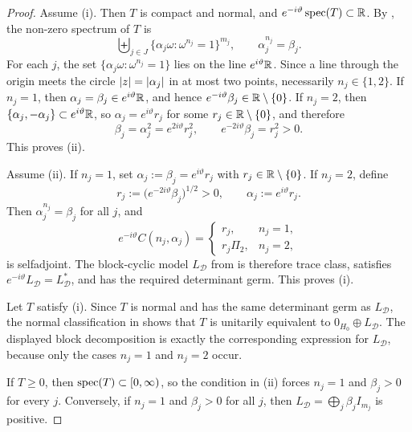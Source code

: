 \begin{proof}
  Assume \textup{(i)}. Then \(T\) is compact and normal, and
  \(e^{-i\vartheta}\operatorname{spec}(T)\subset\mathbb{R}\). By
  , the non-zero spectrum of \(T\)
  is
  \[
    \biguplus_{j\in J}\bigl\{\alpha_j\omega:\omega^{n_j}=1\bigr\}^{m_j},
    \qquad
    \alpha_j^{n_j}=\beta_j.
  \]
  For each \(j\), the set
  \(
    \{\alpha_j\omega:\omega^{n_j}=1\}
  \)
  lies on the line \(e^{i\vartheta}\mathbb{R}\). Since a line through the origin
  meets the circle \(\lvert z \rvert=\lvert \alpha_j \rvert\) in at most two points,
  necessarily \(n_j\in\{1,2\}\). If \(n_j=1\), then
  \(
    \alpha_j=\beta_j\in e^{i\vartheta}\mathbb{R}
  \),
  and hence \(e^{-i\vartheta}\beta_j\in\mathbb{R}\setminus\{0\}\). If
  \(n_j=2\), then
  \(
    \{\alpha_j,-\alpha_j\}\subset e^{i\vartheta}\mathbb{R}
  \),
  so \(\alpha_j=e^{i\vartheta}r_j\) for some
  \(r_j\in \mathbb{R}\setminus\{0\}\), and therefore
  \[
    \beta_j=\alpha_j^2=e^{2i\vartheta}r_j^2,
    \qquad
    e^{-2i\vartheta}\beta_j=r_j^2>0.
  \]
  This proves \textup{(ii)}.

  Assume \textup{(ii)}. If \(n_j=1\), set
  \(
    \alpha_j:=\beta_j=e^{i\vartheta}r_j
  \)
  with \(r_j\in\mathbb{R}\setminus\{0\}\). If \(n_j=2\), define
  \[
    r_j:=\bigl(e^{-2i\vartheta}\beta_j\bigr)^{1/2}>0,
    \qquad
    \alpha_j:=e^{i\vartheta}r_j.
  \]
  Then \(\alpha_j^{n_j}=\beta_j\) for all \(j\), and
  \[
    e^{-i\vartheta}C(n_j,\alpha_j)
    =
    \begin{cases}
      r_j, & n_j=1,\\
      r_j\Pi_2, & n_j=2,
    \end{cases}
  \]
  is selfadjoint. The block-cyclic model \(L_{\mathcal D}\) from
   is therefore trace class,
  satisfies \(e^{-i\vartheta}L_{\mathcal D}=L_{\mathcal D}^*\), and has
  the required determinant germ. This proves \textup{(i)}.

  Let \(T\) satisfy \textup{(i)}. Since \(T\) is normal and has the same
  determinant germ as \(L_{\mathcal D}\), the normal classification in
   shows that \(T\) is unitarily
  equivalent to \(0_{H_0}\oplus L_{\mathcal D}\). The displayed block
  decomposition is exactly the corresponding expression for
  \(L_{\mathcal D}\), because only the cases \(n_j=1\) and \(n_j=2\)
  occur.

  If \(T\ge 0\), then \(\operatorname{spec}(T)\subset [0,\infty)\), so the condition
  in \textup{(ii)} forces \(n_j=1\) and \(\beta_j>0\) for every \(j\).
  Conversely, if \(n_j=1\) and \(\beta_j>0\) for all \(j\), then
  \(L_{\mathcal D}=\bigoplus_j \beta_j I_{m_j}\) is positive.
\end{proof}

